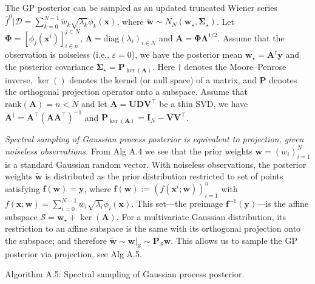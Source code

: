 \documentclass{article}
\begin{document}
The GP posterior can be sampled as an updated truncated Wiener series
$\widehat{f}^0 | \mathcal{D} = \sum_{k=0}^{N-1} \widetilde{w}_k \sqrt{\lambda_k} \phi_k(\mathbf{x})$,
where
$\widetilde{\mathbf{w}} \sim N_N(\mathbf{w}_\star, \boldsymbol{\Sigma}_\star)$.
Let $\boldsymbol{\Phi} = [\phi_j(\mathbf{x}^i)]_{i \in n}^{j \in N}$,
$\boldsymbol{\Lambda} = \mathrm{diag}(\lambda_i)_{i \in N}$ and
$\mathbf{A} = \boldsymbol{\Phi} \boldsymbol{\Lambda}^{1/2}$. Assume
that the observation is noiseless (i.e., $\varepsilon = 0$), we have
the posterior mean $\mathbf{w}_\star = \mathbf{A}^\dagger \mathbf{y}$
and the posterior covariance
$\boldsymbol{\Sigma}_\star = \mathbf{P}_{\ker(\mathbf{A})}$. Here
$\dagger$ denotes the Moore--Penrose inverse, $\ker()$ denotes the
kernel (or null space) of a matrix, and $\mathbf{P}$ denotes the
orthogonal projection operator onto a subspace. Assume that
$\mathrm{rank}(\mathbf{A}) = n < N$ and let
$\mathbf{A} = \mathbf{U} \mathbf{D} \mathbf{V}^\intercal$ be a thin
SVD, we have
$\mathbf{A}^\dagger = \mathbf{A}^\intercal (\mathbf{A} \mathbf{A}^\intercal)^{-1}$
and
$\mathbf{P}_{\ker(\mathbf{A})} = \mathbf{I}_N - \mathbf{V} \mathbf{V}^\intercal$.

\emph{Spectral sampling of Gaussian process posterior is equivalent to
projection, given noiseless observations.} From Alg A.4 we see that the
prior weights $\mathbf{w} = (w_i)_{i=1}^N$ is a standard Gaussian
random vector. With noiseless observations, the posterior weights
$\widetilde{\mathbf{w}}$ is distributed as the prior distribution
restricted to set of points satisfying
$\mathbf{f}(\mathbf{w}) = \mathbf{y}$, where
$\mathbf{f}(\mathbf{w}) := (f(\mathbf{x}^i; \mathbf{w}))_{i=1}^n$ with
$f(\mathbf{x}; \mathbf{w}) = \sum_{i=0}^{N-1} w_i \sqrt{\lambda_i} \phi_i(\mathbf{x})$.
This set---the preimage $\mathbf{f}^{-1}(\mathbf{y})$---is the affine
subspace $\mathcal{S} = \mathbf{w}_\star + \ker(\mathbf{A})$. For a
multivariate Gaussian distribution, its restriction to an affine
subspace is the same with its orthogonal projection onto the subspace;
and therefore
$\widetilde{\mathbf{w}} \sim \mathbf{w}|_{\mathcal{S}} \sim \mathbf{P}_{\mathcal{S}} \mathbf{w}$.
This allows us to sample the GP posterior via projection, see Alg A.5.

Algorithm A.5: Spectral sampling of Gaussian process posterior.
\end{document}
